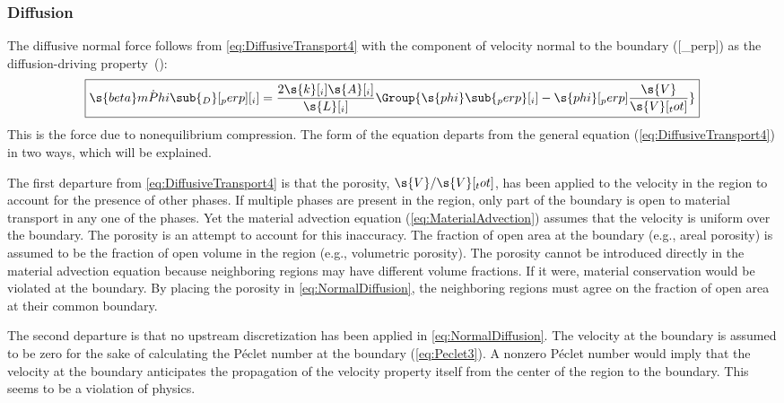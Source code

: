 \subsubsection{Diffusion}
\label{sec:NormalDiffusion}

The diffusive normal force follows from \autoref{eq:DiffusiveTransport4} with the component of velocity normal to the boundary ([_perp]) as the diffusion-driving property~():
\begin{equation}
  \label{eq:NormalDiffusion}
  \boxed{\s{beta}\dot{mPhi}\sub{_D}[_perp][_i] = \frac{2\s{k}[_i]\s{A}[_i]}{\s{L}[_i]}\Group{\s{phi}\sub{_perp}[_i] - \s{phi}[_perp]\frac{\s{V}}{\s{V}[_tot]}}}
\end{equation}
This is the force due to nonequilibrium compression.  The form of the equation departs from the general equation (\ref{eq:DiffusiveTransport4}) in two ways, which will be explained.

The first departure from \autoref{eq:DiffusiveTransport4} is that the porosity, $\s{V}/\s{V}[_tot]$, has been applied to the velocity in the region to account for the presence of other phases.  If multiple phases are present in the region, only part of the boundary is open to material transport in any one of the phases.  Yet the material advection equation (\ref{eq:MaterialAdvection}) assumes that the velocity is uniform over the boundary.  The porosity is an attempt to account for this inaccuracy.  The fraction of open area at the boundary (e.g., areal porosity) is assumed to be the fraction of open volume in the region (e.g., volumetric porosity).  The porosity cannot be introduced directly in the material advection equation because neighboring regions may have different volume fractions.  If it were, material conservation would be violated at the boundary.  By placing the porosity in \autoref{eq:NormalDiffusion}, the neighboring regions must agree on the fraction of open area at their common boundary.

The second departure is that no upstream discretization has been applied in \autoref{eq:NormalDiffusion}.  The velocity at the boundary is assumed to be zero for the sake of calculating the P\'eclet number at the boundary (\autoref{eq:Peclet3}).  A nonzero P\'eclet number would imply that the velocity at the boundary anticipates the propagation of the velocity property itself from the center of the region to the boundary.  This seems to be a violation of physics.


